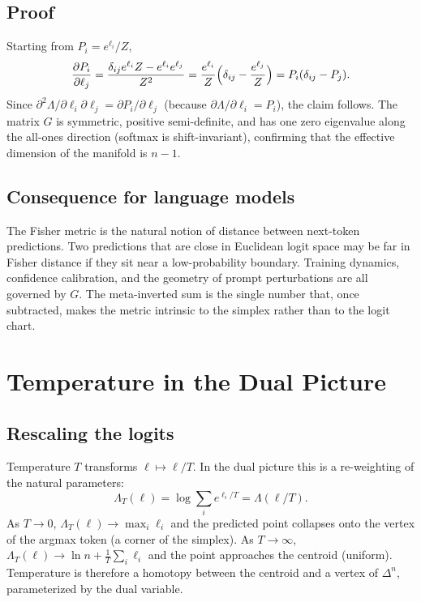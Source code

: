 \documentclass[11pt]{article}
\newcommand{\simplex}[1]{\Delta^{#1}}
\begin{document}
\subsection{Proof}
\label{sec:fisher-proof}

Starting from $P_i = e^{\ell_i}/Z$,
\[
\frac{\partial P_i}{\partial \ell_j}
= \frac{\delta_{ij}e^{\ell_i}Z - e^{\ell_i}e^{\ell_j}}{Z^2}
= \frac{e^{\ell_i}}{Z}\Bigl(\delta_{ij} - \frac{e^{\ell_j}}{Z}\Bigr)
= P_i(\delta_{ij} - P_j).
\]
Since $\partial^2\Lambda/\partial\ell_i\partial\ell_j
= \partial P_i/\partial\ell_j$ (because $\partial\Lambda/\partial\ell_i =
P_i$), the claim follows. The matrix $G$ is symmetric, positive
semi-definite, and has one zero eigenvalue along the all-ones direction
(softmax is shift-invariant), confirming that the effective dimension of the
manifold is $n-1$.

\subsection{Consequence for language models}
\label{sec:fisher-conseq}

The Fisher metric is the natural notion of distance between next-token
predictions. Two predictions that are close in Euclidean logit space may be far
in Fisher distance if they sit near a low-probability boundary. Training
dynamics, confidence calibration, and the geometry of prompt perturbations are
all governed by $G$. The meta-inverted sum is the single number that, once
subtracted, makes the metric intrinsic to the simplex rather than to the
logit chart.

\section{Temperature in the Dual Picture}
\label{sec:temperature}

\subsection{Rescaling the logits}
\label{sec:temp-rescale}

Temperature $T$ transforms $\ell\mapsto \ell/T$. In the dual picture this is a
re-weighting of the natural parameters:
\[
\Lambda_T(\ell) = \log\sum_i e^{\ell_i/T}
= \Lambda(\ell/T).
\]
As $T\to 0$, $\Lambda_T(\ell)\to \max_i \ell_i$ and the predicted point
collapses onto the vertex of the argmax token (a corner of the simplex). As
$T\to\infty$, $\Lambda_T(\ell)\to \ln n + \tfrac{1}{T}\sum_i\ell_i$ and the
point approaches the centroid (uniform). Temperature is therefore a homotopy
between the centroid and a vertex of $\simplex{n}$, parameterized by the dual
variable.
\end{document}
